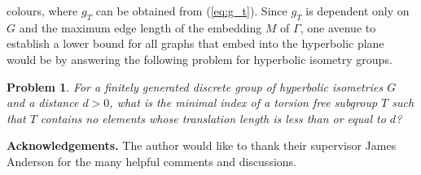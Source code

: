 \documentclass{article}
\numberwithin{equation}{section}
\newtheorem{problem}{Problem}[section]
\theoremstyle{definition}
\theoremstyle{remark}
\begin{document}
colours, where $g_T$ can be obtained from (\ref{eq:g_t}). 
Since $g_T$ is dependent only on $G$ and the maximum edge length of the embedding $M$ of $\Gamma$, one avenue to establish a lower bound for all graphs that embed into the hyperbolic plane would be by answering the following problem for hyperbolic isometry groups.  
\begin{problem}
   For a finitely generated discrete group of hyperbolic isometries $G$ and a distance $d>0$, what is the minimal index of a torsion free subgroup $T$ such that $T$ contains no elements whose translation length is less than or equal to $d$?
\end{problem}

\textbf{Acknowledgements.} The author would like to thank their supervisor James Anderson for the many helpful comments and discussions.  







\end{document}
